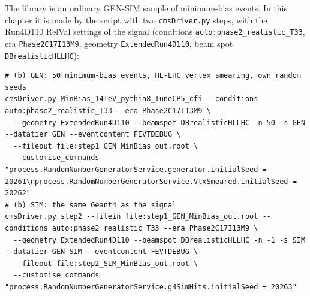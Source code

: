 \documentclass[11pt,a4paper]{article}
\newcommand{\code}[1]{\texttt{#1}}
\begin{document}
The library is an ordinary GEN-SIM sample of minimum-bias events. In this chapter it is made by the script
with two \code{cmsDriver.py} steps, with the Run4D110 RelVal settings of the signal (conditions
\code{auto:phase2\_realistic\_T33}, era \code{Phase2C17I13M9}, geometry \code{ExtendedRun4D110}, beam spot
\code{DBrealisticHLLHC}):
\begin{lstlisting}[style=sh]
# (b) GEN: 50 minimum-bias events, HL-LHC vertex smearing, own random seeds
cmsDriver.py MinBias_14TeV_pythia8_TuneCP5_cfi --conditions auto:phase2_realistic_T33 --era Phase2C17I13M9 \
  --geometry ExtendedRun4D110 --beamspot DBrealisticHLLHC -n 50 -s GEN --datatier GEN --eventcontent FEVTDEBUG \
  --fileout file:step1_GEN_MinBias_out.root \
  --customise_commands "process.RandomNumberGeneratorService.generator.initialSeed = 20261\nprocess.RandomNumberGeneratorService.VtxSmeared.initialSeed = 20262"
# (b) SIM: the same Geant4 as the signal
cmsDriver.py step2 --filein file:step1_GEN_MinBias_out.root --conditions auto:phase2_realistic_T33 --era Phase2C17I13M9 \
  --geometry ExtendedRun4D110 --beamspot DBrealisticHLLHC -n -1 -s SIM --datatier GEN-SIM --eventcontent FEVTDEBUG \
  --fileout file:step2_SIM_MinBias_out.root \
  --customise_commands "process.RandomNumberGeneratorService.g4SimHits.initialSeed = 20263"
\end{lstlisting}
\end{document}
